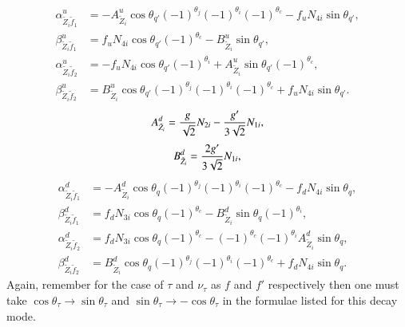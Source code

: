 \documentclass[final,3p,times]{elsarticle}
\begin{document}
\begin{align}
\alpha_{\tilde{Z}_{i} \tilde{f}_1}^{u} &= -A_{\tilde{Z}_{i}}^{u}\cos\theta_{q'} (-1)^{\theta_j} (-1)^{\theta_i}(-1)^{\theta_c} - f_{u}N_{4i}\sin\theta_{q'}, \\
\beta_{\tilde{Z}_{i} \tilde{f}_1}^{u} &= f_{u}N_{4i}\cos\theta_{q'}(-1)^{\theta_c} - B_{\tilde{Z}_{i}}^{u}\sin\theta_{q'}, \\
\alpha_{\tilde{Z}_{i} \tilde{f}_2}^{u} &= -f_{u}N_{4i}\cos\theta_{q'}(-1)^{\theta_i} + A_{\tilde{Z}_{i}}^{u}\sin\theta_{q'}(-1)^{\theta_c}, \\
\beta_{\tilde{Z}_{i} \tilde{f}_2}^{u} &= B_{\tilde{Z}_{i}}^{u}\cos\theta_{q'}(-1)^{\theta_j}(-1)^{\theta_i}(-1)^{\theta_c} + f_{u}N_{4i}\sin\theta_{q'}.
\end{align}
\begin{equation}
A_{\tilde{Z}_{i}}^{d} = {g \over \sqrt{2}}N_{2i} - {g' \over 3 \sqrt{2}}N_{1i},
\end{equation}
\begin{equation}
B_{\tilde{Z}_{i}}^{d} = {2g' \over 3 \sqrt{2}}N_{1i},
\end{equation}
\begin{align}
\alpha_{\tilde{Z}_{i} \tilde{f}_1}^{d} &= -A_{\tilde{Z}_{i}}^{d}\cos\theta_{q}(-1)^{\theta_j}(-1)^{\theta_i}(-1)^{\theta_c} - f_{d}N_{4i}\sin\theta_{q}, \\
\beta_{\tilde{Z}_{i} \tilde{f}_1}^{d} &= f_{d}N_{3i}\cos\theta_{q} (-1)^{\theta_c} - B_{\tilde{Z}_{i}}^{d}\sin\theta_{q}(-1)^{\theta_i}, \\
\alpha_{\tilde{Z}_{i} \tilde{f}_2}^{d} &= f_{d}N_{3i}\cos\theta_{q}(-1)^{\theta_c} - (-1)^{\theta_c}(-1)^{\theta_i} A_{\tilde{Z}_{i}}^{d}\sin\theta_{q}, \\
\beta_{\tilde{Z}_{i} \tilde{f}_2}^{d} &= B_{\tilde{Z}_{i}}^{d}\cos\theta_{q}(-1)^{\theta_j}(-1)^{\theta_i}(-1)^{\theta_c} + f_{d}N_{4i}\sin\theta_q.
\end{align}
Again, remember for the case of $\tau$ and $\nu_{\tau}$ as $f$ and $f'$ respectively then one must take $\cos\theta_{\tau} \rightarrow \sin\theta_{\tau}$ and $\sin\theta_{\tau} \rightarrow -\cos\theta_{\tau}$ in the formulae listed for this decay mode. 
\end{document}
